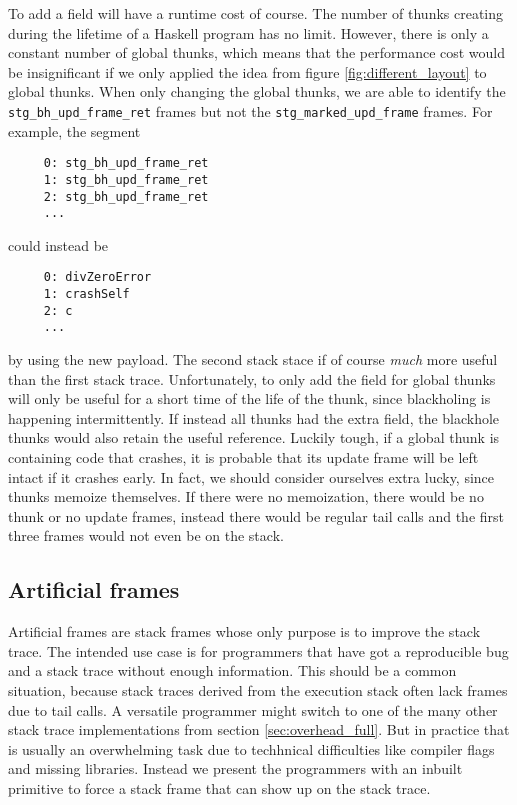 To add a field will have a runtime cost of course. The number of thunks
creating during the lifetime of a Haskell program has no limit. However,
there is only a constant number of global thunks, which means that the
performance cost would be insignificant if we only applied the idea from
figure \ref{fig:different_layout} to global thunks. When
only changing the global thunks, we are able to identify
the \texttt{stg\_bh\_upd\_frame\_ret} frames but not the
\texttt{stg\_marked\_upd\_frame} frames. For example, the
segment

\begin{verbatim}
     0: stg_bh_upd_frame_ret
     1: stg_bh_upd_frame_ret
     2: stg_bh_upd_frame_ret
     ...
\end{verbatim}

could instead be

\begin{verbatim}
     0: divZeroError
     1: crashSelf
     2: c
     ...
\end{verbatim}

by using the new payload. The second stack stace if of course
\emph{much} more useful than the first stack trace. Unfortunately,
to only add the field for global thunks will only be useful for a
short time of the life of the thunk, since blackholing is happening
intermittently. If instead all thunks had the extra field, the blackhole
thunks would also retain the useful reference. Luckily tough, if a
global thunk is containing code that crashes, it is probable that its
update frame will be left intact if it crashes early. In
fact, we should consider ourselves extra lucky, since thunks
memoize themselves. If there were no memoization,
there would be no thunk or no update frames, instead there would be
regular tail calls and the first three frames would not even be on the stack.

\subsection{Artificial frames}

Artificial frames are stack frames whose only purpose is to improve
the stack trace. The intended use case is for programmers that have
got a reproducible bug and a stack trace without enough information.
This should be a common situation, because stack traces derived from the
execution stack often lack frames due to tail calls. A versatile
programmer might switch to one of the many other stack trace
implementations from section \ref{sec:overhead_full}.
But in practice that is usually an overwhelming task
due to techhnical difficulties like compiler flags and missing libraries. Instead we present
the programmers with an inbuilt primitive to force a stack frame that can
show up on the stack trace.

